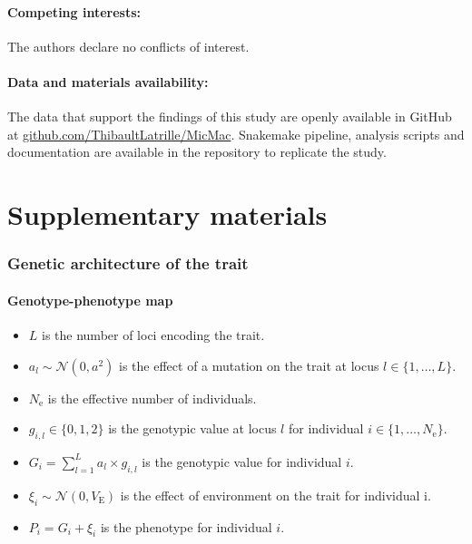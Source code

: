 \documentclass{article}
\newcommand{\Ne}{N_{\text{e}}}
\newcommand{\Trait}{P}
\newcommand{\NbrLoci}{L}
\newcommand{\VarEnv}{V_{\mathrm{E}}}
\renewcommand{\baselinestretch}{1.5}
\begin{document}
\subsection*{Competing interests:}
The authors declare no conflicts of interest.

\subsection*{Data and materials availability:}
The data that support the findings of this study are openly available in GitHub at \href{https://github.com/ThibaultLatrille/MicMac}{github.com/ThibaultLatrille/MicMac}. Snakemake pipeline, analysis scripts and documentation are available in the repository to replicate the study.



\printbibliography

\newpage

\noindent\usebox{\Maketitle}

\part*{Supplementary materials}
\renewcommand{\thetable}{S\arabic{table}}
\renewcommand{\thefigure}{S\arabic{figure}}
\setcounter{figure}{0}
\setcounter{table}{0}
\setcounter{section}{0}

\renewcommand{\baselinestretch}{1.0}\normalsize
\tableofcontents
\renewcommand{\baselinestretch}{1.5}\normalsize

\newpage
\section{Genetic architecture of the trait}\label{sec:simulator}

\subsection{Genotype-phenotype map}\label{subsec:genotype-phenotype-map}

\begin{itemize}
    \item $\NbrLoci$ is the number of loci encoding the trait.
    \item $a_l \sim \mathcal{N}(0,a^2)$ is the effect of a mutation on the trait at locus $l \in \{1, \hdots, \NbrLoci\}$.
    \item $\Ne$ is the effective number of individuals.
    \item $g_{i,l} \in \{0, 1, 2\}$ is the genotypic value at locus $l$ for individual $i \in \{1, \hdots, \Ne\}$.
    \item $G_i = \sum_{l=1}^{\NbrLoci} a_l \times g_{i,l}$ is the genotypic value for individual $i$.
    \item $\xi_i \sim \mathcal{N}(0, \VarEnv)$ is the effect of environment on the trait for individual i.
    \item $\Trait_i = G_i + \xi_i$ is the phenotype for individual $i$.
\end{itemize}
\end{document}
